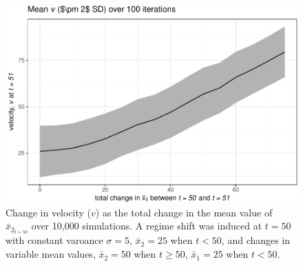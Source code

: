 \documentclass[12pt,twoside,openany]{reedthesis}
\begin{document}
\begin{figure}
\centering
\includegraphics{_myDissertation_files/figure-latex/simVplot2-1.pdf}
\caption{\label{fig:simVplot2}Change in velocity (\(v\)) as the total change
in the mean value of \(\bar{x}_{2_{t=50}}\) over 10,000 simulations. A
regime shift was induced at \(t=50\) with constant varoance
\(\sigma = 5\), \(\bar{x}_2 = 25\) when \(t<50\), and changes in
variable mean values, \(\bar{x}_2 = 50\) when \(t \geq 50\),
\(\bar{x}_1 = 25\) when \(t<50\).}
\end{figure}
\end{document}
